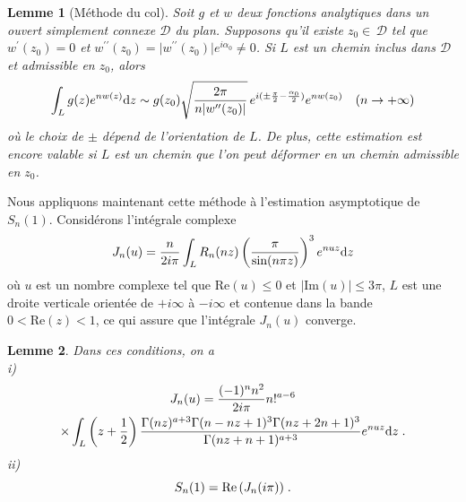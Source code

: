 \documentclass[12pt]{article}
\newcommand{\al}{\alpha}
\newcommand{\io}{+\infty}
\newcommand{\lm}{\left}
\newcommand{\rt}{\right}
\newtheorem{lem}{Lemme}
\begin{document}
\begin{lem}[M\'ethode du col]
Soit $g$ et $w$ deux fonctions analytiques dans un ouvert simplement
connexe $\mathcal{D}$
du plan. Supposons qu'il existe $z_0\in\,\mathcal{D}$ tel que
$w^{\prime}(z_0)=0$ et
$w^{\prime\prime}(z_0)= \vert w^{\prime\prime}(z_0)\vert
e^{i\al_0}\not=0$. Si $L$ est un chemin inclus dans $\mathcal{D}$ et
admissible en $z_0$, alors
\begin{eqnarray}
\int_L g(z)e^{nw(z)}\textup{d}z \sim g(z_0)
\sqrt{\frac{2\pi}{n\vert w^{\prime\prime}(z_0) \vert}}
\,e^{i(\pm\frac{\pi}{2}-\frac{\al_0}{2})}e^{nw(z_0)}\quad (n\to\io)
\end{eqnarray}
o\`u le choix de $\pm$ d\'epend de l'orientation de $L$.
De plus, cette estimation est encore valable si $L$ est un chemin que l'on peut
d\'eformer en un chemin admissible en $z_0$.
\end{lem}

Nous appliquons maintenant cette m\'ethode \`a
l'estimation asymptotique de $S_n(1)$. Consid\'erons l'int\'egrale complexe
$$
J_n(u)=\frac{n}{2i\pi}\int_L R_n(nz)\lm(\frac{\pi}{\sin(n\pi z)}\rt)^3
e^{nuz}\textup{d}z
$$
o\`u $u$ est un nombre
complexe tel que $\text{Re}(u)\le 0$ et $\vert \text{Im}(u) \vert\le 3\pi$,
$L$ est une droite verticale orient\'ee de $+i\infty$ \`a $-i\infty$ 
et contenue
dans la bande $0<\text{Re}(z)<1$, ce qui assure que
l'int\'egrale $J_n(u)$ converge.\\

\begin{lem}
Dans ces conditions, on a\\ \null
\textit{i)}
\begin{multline*}
J_n(u)=\frac{(-1)^n n^2}{2i\pi} n!^{a-6}\\
\times\int_L\lm(z+\frac{1}{2}\rt)
\frac{\Gamma(nz)^{a+3}\Gamma(n-nz+1)^3
\Gamma(nz+2n+1)^3}{\Gamma(nz+n+1)^{a+3}}e^{nuz}\textup{d}z\;.
\end{multline*}
\textit{ii)}
$$
S_n(1)=\textup{Re}\,(J_n(i\pi))\;.
$$
\end{lem}
\end{document}
